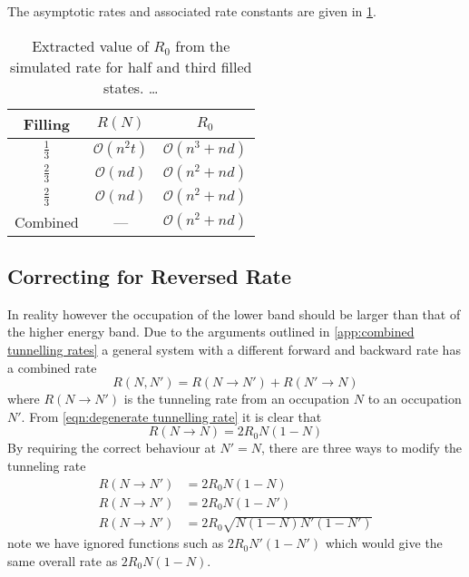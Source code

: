 The asymptotic rates and associated rate constants
are given in \cref{tab:extracted rate constant}.
\begin{table}[htbp]
    \begin{center}
        \begin{tabular}{ *{3}{c} }
            \toprule
            Filling         & \(R(N)\)               & \(R_0\)                    \\
            \midrule
            \(\frac{1}{3}\) & \(\mathcal{O}(n^2 t)\) & \(\mathcal{O}(n^3 + n d)\) \\
            \(\frac{2}{3}\) & \(\mathcal{O}(n d)\)   & \(\mathcal{O}(n^2 + n d)\) \\
            \(\frac{2}{3}\) & \(\mathcal{O}(n d)\)   & \(\mathcal{O}(n^2 + n d)\) \\
            Combined        & ---                    & \(\mathcal{O}(n^2 + n d)\) \\
            \bottomrule
        \end{tabular}
    \end{center}
    \caption{Extracted value of \(R_0\) from the
        simulated rate for half and third filled
        states. \ldots
    }\label{tab:extracted rate constant}
\end{table}

\subsection{Correcting for Reversed Rate}
In reality however the occupation
of the lower band should be larger than
that of the higher energy band. Due to
the arguments outlined in
\cref{app:combined tunnelling rates}
a general system with a different
forward and backward rate has a combined rate
\begin{equation}
    R(N,N') = R(N\rightarrow{}N') + R(N'\rightarrow{}N)
\end{equation}
where \(R(N\rightarrow{}N')\) is the
tunneling rate from an occupation \(N\)
to an occupation \(N'\). From
\cref{eqn:degenerate tunnelling rate}
it is clear that
\begin{equation}
    R(N\rightarrow{}N) = 2R_0N(1-N)
\end{equation}
By requiring the correct
behaviour at \(N' = N\), there are
three ways to modify the tunneling
rate
\begin{align}
    R(N\rightarrow{}N') & = 2R_0N(1-N)                 \\
    R(N\rightarrow{}N') & = 2R_0N(1-N')                \\
    R(N\rightarrow{}N') & = 2R_0 \sqrt{N(1-N)N'(1-N')}
\end{align}
note we have ignored functions
such as \(2R_0N'(1-N')\) which
would give the same overall rate
as \(2R_0N(1-N)\).

